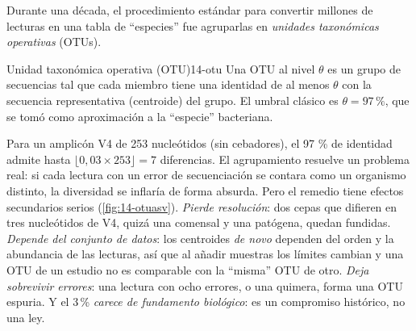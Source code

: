 Durante una década, el procedimiento estándar para convertir millones de lecturas en una tabla de ``especies'' fue agruparlas en \emph{unidades taxonómicas operativas} (OTUs).

\begin{definicion}{Unidad taxonómica operativa (OTU)}{14-otu}
Una OTU al nivel $\theta$ es un grupo de secuencias tal que cada miembro tiene una identidad de al menos $\theta$ con la secuencia representativa (centroide) del grupo. El umbral clásico es $\theta = 97\,\%$, que se tomó como aproximación a la ``especie'' bacteriana.
\end{definicion}

Para un amplicón V4 de 253 nucleótidos (sin cebadores), el 97 \% de identidad admite hasta $\lfloor 0{,}03 \times 253\rfloor = 7$ diferencias. El agrupamiento resuelve un problema real: si cada lectura con un error de secuenciación se contara como un organismo distinto, la diversidad se inflaría de forma absurda. Pero el remedio tiene efectos secundarios serios (\cref{fig:14-otuasv}). \emph{Pierde resolución}: dos cepas que difieren en tres nucleótidos de V4, quizá una comensal y una patógena, quedan fundidas. \emph{Depende del conjunto de datos}: los centroides \emph{de novo} dependen del orden y la abundancia de las lecturas, así que al añadir muestras los límites cambian y una OTU de un estudio no es comparable con la ``misma'' OTU de otro. \emph{Deja sobrevivir errores}: una lectura con ocho errores, o una quimera, forma una OTU espuria. Y el 3\,\% \emph{carece de fundamento biológico}: es un compromiso histórico, no una ley.

